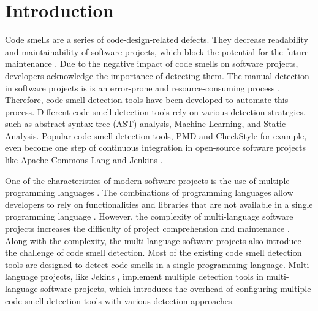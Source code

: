 \section{Introduction}
\label{sec:introduction}

%



Code smells are a series of code-design-related defects. They decrease
readability \cite{5741260} and maintainability \cite{6392174,6405287} of software projects,
which block the potential for the future maintenance \cite{Fowler_Beck}. Due to the negative impact of code smells on software projects,
developers acknowledge the importance of detecting them. The manual detection in
software projects is is an error-prone and resource-consuming process \cite{DetectingDefectsInObject}. 
Therefore, code smell detection tools have been developed to automate this process.
Different code smell detection tools rely on various detection strategies,
such as abstract syntax tree (AST) analysis, Machine Learning, and Static Analysis.
Popular code smell detection tools, PMD \cite{PMD} and CheckStyle \cite{CheckStyle} for example,
even become one step of continuous integration in open-source software projects like Apache Commons Lang \cite{ApacheCommonsLang} and Jenkins \cite{Jekins}.

One of the characteristics of modern software projects is the use of multiple programming languages \cite{723183}. The combinations of
programming languages allow developers to rely on functionalities and libraries that are not available in a single programming language \cite{7476675}.
However, the complexity of multi-language software projects increases the difficulty of project comprehension and maintenance \cite{7476675, 10.1109/SCAM.2012.11, 7396422}.
Along with the complexity, the multi-language software projects also introduce the challenge of code smell detection. 
Most of the existing code smell detection tools are designed to detect code smells in a single programming language. Multi-language projects, like Jekins \cite{Jekins},
implement multiple detection tools in multi-language software projects, which introduces the overhead of configuring multiple code smell detection tools with various detection approaches.

